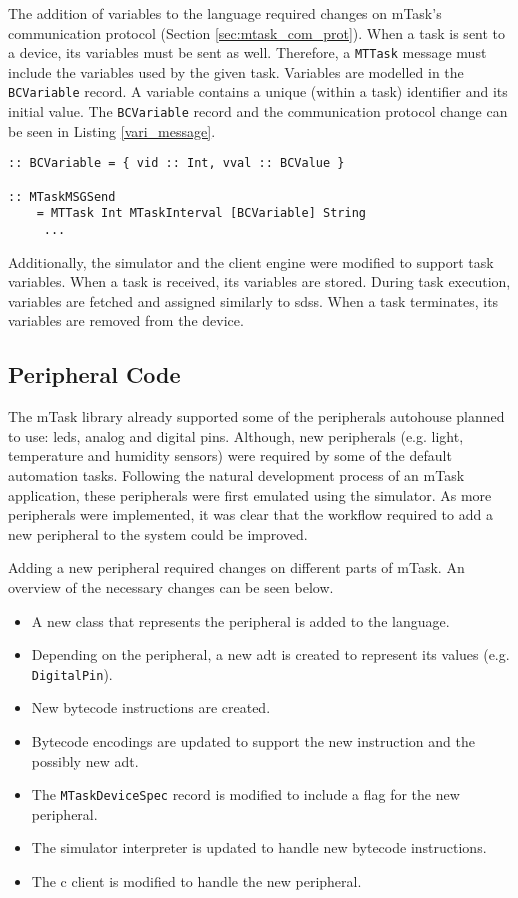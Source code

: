 The addition of variables to the language required changes on \gls{mTask}'s communication protocol (Section \ref{sec:mtask_com_prot}). When a task is sent to a device, its variables must be sent as well. Therefore, a \texttt{MTTask} message must include the variables used by the given task. Variables are modelled in the \texttt{BCVariable} record. A variable contains a unique (within a task) identifier and its initial value. The \texttt{BCVariable} record and the communication protocol change can be seen in Listing \ref{vari_message}.

\begin{lstlisting}[caption=Change in mTask's communication protocol to accommodate task variables,captionpos=b,label=vari_message]
:: BCVariable = { vid :: Int, vval :: BCValue }

:: MTaskMSGSend
	= MTTask Int MTaskInterval [BCVariable] String
	 ...
\end{lstlisting}

Additionally, the simulator and the client engine were modified to support task variables. When a task is received, its variables are stored. During task execution, variables are fetched and assigned similarly to \acp{sds}. When a task terminates, its variables are removed from the device.

\subsection{Peripheral Code}

The \gls{mTask} library already supported some of the peripherals \gls{autohouse} planned to use: \acsp{led}, analog and digital pins. Although, new peripherals (e.g. light, temperature and humidity sensors) were required by some of the default automation tasks. Following the natural development process of an \gls{mTask} application, these peripherals were first emulated using the simulator. As more peripherals were implemented, it was clear that the workflow required to add a new peripheral to the system could be improved.

Adding a new peripheral required changes on different parts of \gls{mTask}. An overview of the necessary changes can be seen below.

\begin{itemize}
    \item A new class that represents the peripheral is added to the language. 
    \item Depending on the peripheral, a new \ac{adt} is created to represent its values (e.g. \texttt{DigitalPin}).
    \item New bytecode instructions are created.
    \item Bytecode encodings are updated to support the new instruction and the possibly new \acs{adt}.
    \item The \texttt{MTaskDeviceSpec} record is modified to include a flag for the new peripheral.
    \item The simulator interpreter is updated to handle new bytecode instructions.
    \item The \gls{c} client is modified to handle the new peripheral.
\end{itemize}

